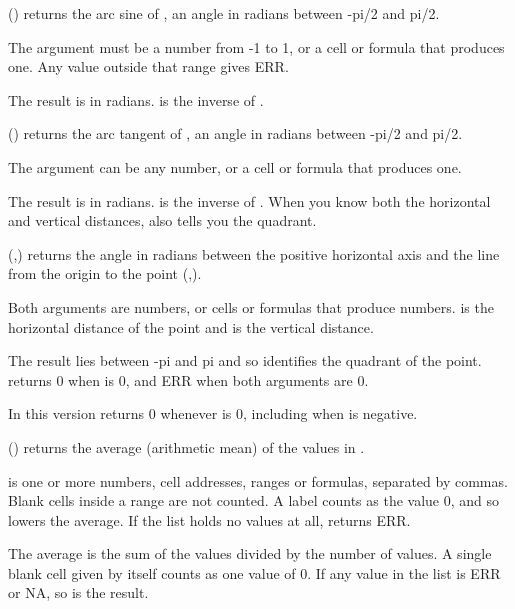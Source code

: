 \Examples
{}

() returns the arc sine of , an angle in radians between -pi/2 and pi/2.

The argument  must be a number from -1 to 1, or a cell or formula that produces one. Any value outside that range gives ERR.

The result is in radians.  is the inverse of .

\Examples
{}

() returns the arc tangent of , an angle in radians between -pi/2 and pi/2.

The argument  can be any number, or a cell or formula that produces one.

The result is in radians.  is the inverse of . When you know both the horizontal and vertical distances,  also tells you the quadrant.

\Examples
{}

(,) returns the angle in radians between the positive horizontal axis and the line from the origin to the point (,).

Both arguments are numbers, or cells or formulas that produce numbers.  is the horizontal distance of the point and  is the vertical distance.

The result lies between -pi and pi and so identifies the quadrant of the point.  returns 0 when  is 0, and ERR when both arguments are 0.

\begin{Note}
In this version  returns 0 whenever  is 0, including when  is negative.
\end{Note}

\Examples
{}

() returns the average (arithmetic mean) of the values in .

 is one or more numbers, cell addresses, ranges or formulas, separated by commas. Blank cells inside a range are not counted. A label counts as the value 0, and so lowers the average. If the list holds no values at all,  returns ERR.

The average is the sum of the values divided by the number of values. A single blank cell given by itself counts as one value of 0. If any value in the list is ERR or NA, so is the result.

